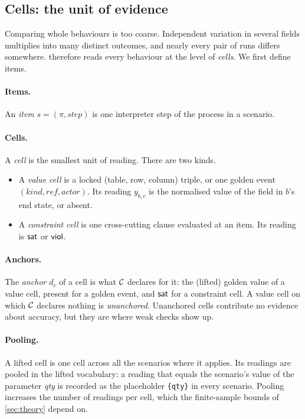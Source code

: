 \subsection{Cells: the unit of evidence}
\label{sec:cells}

Comparing whole behaviours is too coarse. Independent variation in several fields multiplies into many distinct outcomes, and nearly every pair of runs differs somewhere. \specdx therefore reads every behaviour at the level of \emph{cells}. We first define items.

\paragraph{Items.} An \emph{item} $s=(\pi,\textit{step})$ is one interpreter step of the process in a scenario.

\paragraph{Cells.} A \emph{cell} is the smallest unit of reading. There are two kinds.
\begin{itemize}[leftmargin=*]
\item A \emph{value cell} is a locked (table, row, column) triple, or one golden event $(\textit{kind},\textit{ref},\textit{actor})$. Its reading $y_{b,c}$ is the normalised value of the field in $b$'s end state, or \textsf{absent}.
\item A \emph{constraint cell} is one cross-cutting clause evaluated at an item. Its reading is $\textsf{sat}$ or $\textsf{viol}$.
\end{itemize}

\paragraph{Anchors.} The \emph{anchor} $d_c$ of a cell is what $\mathcal{C}$ declares for it: the (lifted) golden value of a value cell, \textsf{present} for a golden event, and $\textsf{sat}$ for a constraint cell. A value cell on which $\mathcal{C}$ declares nothing is \emph{unanchored}. Unanchored cells contribute no evidence about accuracy, but they are where weak checks show up.

\paragraph{Pooling.} A lifted cell is one cell across all the scenarios where it applies. Its readings are pooled in the lifted vocabulary: a reading that equals the scenario's value of the parameter \textit{qty} is recorded as the placeholder \texttt{\{qty\}} in every scenario. Pooling increases the number of readings per cell, which the finite-sample bounds of \cref{sec:theory} depend on.

